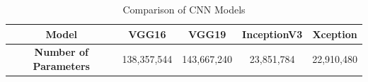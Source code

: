 \begin{table}[htbp]
    \centering
    \caption{Comparison of CNN Models}
    \label{tab:model_comparison}
    \begin{tabular}{ccccc}
        \toprule
        \textbf{Model} & \textbf{VGG16} & \textbf{VGG19} & \textbf{InceptionV3} & \textbf{Xception} \\
        \midrule
        \textbf{Number of Parameters} & 138,357,544 & 143,667,240 & 23,851,784 & 22,910,480 \\
        \bottomrule
    \end{tabular}
\end{table}


\FloatBarrier






